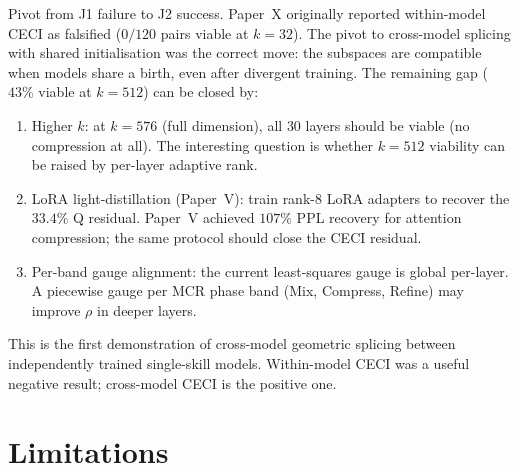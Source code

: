 \documentclass[11pt]{article}
\begin{document}
Pivot from J1 failure to J2 success. Paper~X originally reported
within-model CECI as falsified ($0/120$ pairs viable at $k{=}32$). The
pivot to cross-model splicing with shared initialisation was the correct
move: the subspaces are compatible when models share a birth, even
after divergent training. The remaining gap ($43\%$ viable at $k{=}512$)
can be closed by:
\begin{enumerate}
\item Higher $k$: at $k{=}576$ (full dimension), all $30$ layers
 should be viable (no compression at all). The interesting question is
 whether $k{=}512$ viability can be raised by per-layer adaptive rank.
\item LoRA light-distillation (Paper~V): train rank-$8$ LoRA
 adapters to recover the $33.4\%$ Q residual. Paper~V achieved
 $107\%$ PPL recovery for attention compression; the same protocol
 should close the CECI residual.
\item Per-band gauge alignment: the current least-squares gauge is
 global per-layer. A piecewise gauge per MCR phase band (Mix,
 Compress, Refine) may improve $\rho$ in deeper layers.
\end{enumerate}

This is the first demonstration of cross-model geometric splicing
between independently trained single-skill models. Within-model CECI was
a useful negative result; cross-model CECI is the positive one.

\section{Limitations}
\label{sec:limits}
\end{document}
